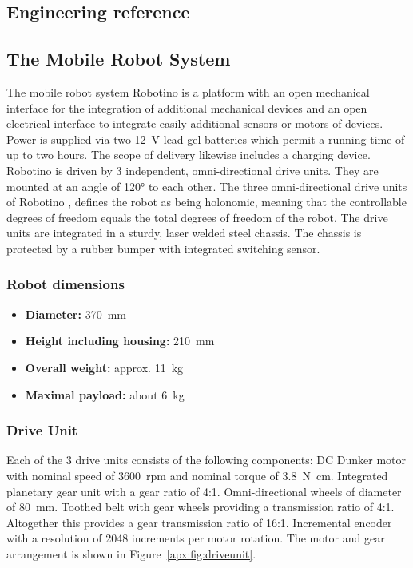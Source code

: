 \documentclass[12pt,twoside]{article}
\begin{document}
\begin{appendix}
\newpage

\section{Engineering reference} \label{apx:sec:engref}
\subsection{The Mobile Robot System}
The mobile robot system Robotino is a platform with an open
mechanical interface for the integration of additional mechanical
devices and an open electrical interface to integrate easily
additional sensors or motors of devices. Power is supplied via two
\SI{12}{\volt} lead gel batteries which permit a running time of up to
two hours.  The scope of delivery likewise includes a charging
device. Robotino is driven by 3 independent, omni-directional drive
units. They are mounted at an angle of \ang{120} to each other. The
three omni-directional drive units of Robotino , defines the robot as
being holonomic, meaning that the controllable degrees of freedom
equals the total degrees of freedom of the robot. The drive units are
integrated in a sturdy, laser welded steel chassis. The chassis is
protected by a rubber bumper with integrated switching sensor.

\subsubsection{Robot dimensions}
\begin{itemize}
	\item[] \textbf{Diameter:} \SI{370}{\milli\metre}
	\item[] \textbf{Height including housing:} \SI{210}{\milli\metre}
 	\item[] \textbf{Overall weight:} approx. \SI{11}{\kilogram}
 	\item[] \textbf{Maximal payload:} about \SI{6}{\kilogram}
 \end{itemize}

\subsubsection{Drive Unit}
Each of the 3 drive units consists of the following components: DC
Dunker motor with nominal speed of \SI{3600}{rpm} and nominal torque
of \SI{3.8}{\newton\centi\metre}. Integrated planetary gear unit with
a gear ratio of 4:1. Omni-directional wheels of diameter of
\SI{80}{\milli\metre}. Toothed belt with gear wheels providing a
transmission ratio of 4:1.
%
Altogether this provides a gear transmission ratio of
16:1. Incremental encoder with a resolution of 2048 increments per
motor rotation.
%
The motor and gear arrangement is shown in
Figure~\ref{apx:fig:driveunit}.


\end{appendix}
\end{document}
